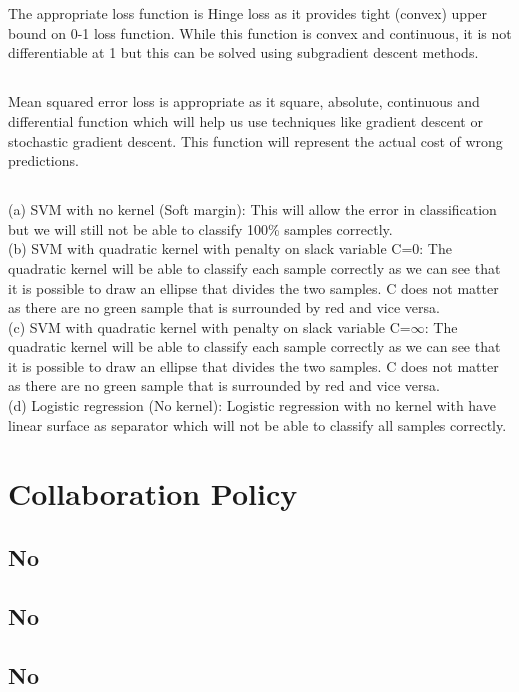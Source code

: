 \documentclass[fleqn]{article}
\begin{document}
	\section{}
	\begin{adjustwidth}{4em}{0pt}
		\subsection{}
		\begin{adjustwidth}{4em}{0pt}
			The appropriate loss function is Hinge loss as it provides tight (convex) upper bound on 0-1 loss function. While this function is convex and continuous, it is not differentiable at 1 but this can be solved using subgradient descent methods.
		\end{adjustwidth}
		\subsection{}
		\begin{adjustwidth}{4em}{0pt}
			Mean squared error loss is appropriate as it square, absolute, continuous and differential function which will help us use techniques like gradient descent or stochastic gradient descent. This function will represent the actual cost of wrong predictions.
		\end{adjustwidth}
		\subsection{}
		\begin{adjustwidth}{4em}{0pt}
			(a) SVM with no kernel (Soft margin): This will allow the error in classification but we will still not be able to classify 100\% samples correctly.\\
			(b) SVM with quadratic kernel with penalty on slack variable C=0: The quadratic kernel will be able to classify each sample correctly as we can see that it is possible to draw an ellipse that divides the two samples. C does not matter as there are no green sample that is surrounded by red and vice versa.\\
			(c) SVM with quadratic kernel with penalty on slack variable C=$\infty$:  The quadratic kernel will be able to classify each sample correctly as we can see that it is possible to draw an ellipse that divides the two samples. C does not matter as there are no green sample that is surrounded by red and vice versa. \\
			(d) Logistic regression (No kernel): Logistic regression with no kernel with have linear surface as separator which will not be able to classify all samples correctly.
		\end{adjustwidth}
	\end{adjustwidth}
	
	\section{Collaboration Policy}
	\subsection{No}
	\subsection{No}
	\subsection{No}
	
\end{document}
